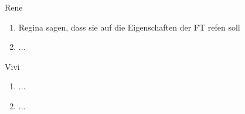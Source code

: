 Rene
\begin{enumerate}
	\item Regina sagen, dass sie auf die Eigenschaften der FT refen soll
	\item ...
\end{enumerate}

Vivi
\begin{enumerate}
	\item ...
	\item ...
\end{enumerate}
